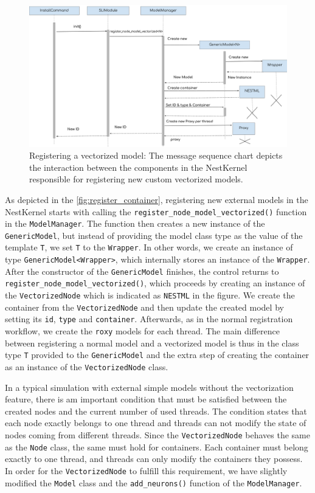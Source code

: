 \begin{figure}[h!]
\centering
\includegraphics[width=\textwidth]{src/pic/node_creation_vec.png}
\caption{Registering a vectorized model: The message sequence chart depicts the interaction between the components in the NestKernel responsible for registering new custom vectorized models.}
\label{fig:register_container}
\end{figure}

As depicted in the \autoref{fig:register_container}, registering new external models in the NestKernel starts with calling the \texttt{register\_node\_model\_vectorized()} function in the \texttt{ModelManager}. The function then creates a new instance of the \texttt{GenericModel}, but instead of providing the model class type as the value of the template \texttt{T}, we set \texttt{T} to the \texttt{Wrapper}. In other words, we create an instance of type \texttt{GenericModel<Wrapper>}, which internally stores an instance of the \texttt{Wrapper}. After the constructor of the \texttt{GenericModel} finishes, the control returns to \texttt{register\_node\_model\_vectorized()}, which proceeds by creating an instance of the \texttt{VectorizedNode} which is indicated as \texttt{NESTML} in the figure. We create the container from the \texttt{VectorizedNode} and then update the created model by setting its \texttt{id}, \texttt{type} and \texttt{container}. Afterwards, as in the normal registration workflow, we create the \texttt{roxy} models for each thread. The main difference between registering a normal model and a vectorized model is thus in the class type \texttt{T} provided to the \texttt{GenericModel} and the extra step of creating the container as an instance of the \texttt{VectorizedNode} class.

In a typical simulation with external simple models without the vectorization feature, there is am important condition that must be satisfied between the created nodes and the current number of used threads. The condition states that each node exactly belongs to one thread and threads can not modify the state of nodes coming from different threads. Since the \texttt{VectorizedNode} behaves the same as the \texttt{Node} class, the same must hold for containers. Each container must belong exactly to one thread, and threads can only modify the containers they possess. In order for the \texttt{VectorizedNode} to fulfill this requirement, we have slightly modified the \texttt{Model} class and the  \texttt{add\_neurons()} function of the \texttt{ModelManager}.\\

